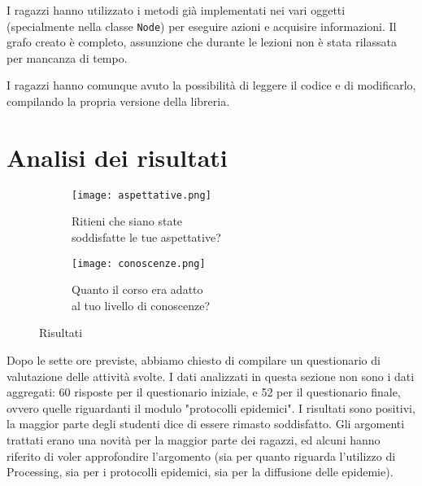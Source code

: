 I ragazzi hanno utilizzato i metodi già implementati nei vari oggetti (specialmente nella classe \texttt{Node}) per eseguire azioni e acquisire informazioni. Il grafo creato è completo, assunzione che durante le lezioni non è stata rilassata per mancanza di tempo.

I ragazzi hanno comunque avuto la possibilità di leggere il codice e di modificarlo, compilando la propria versione della libreria.
\section{Analisi dei risultati}

\begin{figure}[h]
    
    \begin{subfigure}{.5\textwidth}
        \centering
        \texttt{[image: aspettative.png]}
        \captionsetup{justification=centering}
        \caption{Ritieni che siano state \\ soddisfatte le tue aspettative?} 
    \end{subfigure}\hfill
    \begin{subfigure}{.5\textwidth}
        \centering
        \texttt{[image: conoscenze.png]}
        \captionsetup{justification=centering}
        \caption{Quanto il corso era adatto  \\ al tuo livello di conoscenze?} 
    \end{subfigure}
    \caption{Risultati}
\end{figure} 

Dopo le sette ore previste, abbiamo chiesto di compilare un questionario di valutazione delle attività svolte.  I dati analizzati in questa sezione non sono i dati aggregati: 60 risposte per il questionario iniziale, e 52 per il questionario finale, ovvero quelle riguardanti il modulo "protocolli epidemici".
I risultati sono positivi, la maggior parte degli studenti dice di essere rimasto soddisfatto. Gli argomenti trattati erano una novità per la maggior parte dei ragazzi, ed alcuni hanno riferito di voler approfondire l'argomento (sia per quanto riguarda l'utilizzo di Processing, sia per i protocolli epidemici, sia per la diffusione delle epidemie). 

